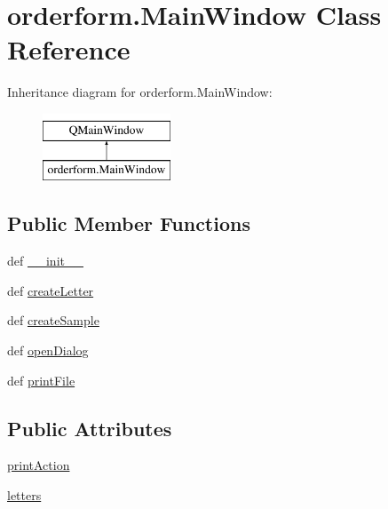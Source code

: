 \hypertarget{classorderform_1_1MainWindow}{}\section{orderform.\+Main\+Window Class Reference}
\label{classorderform_1_1MainWindow}
Inheritance diagram for orderform.\+Main\+Window\+:\begin{figure}[H]
\begin{center}
\leavevmode
\includegraphics[height=2.000000cm]{classorderform_1_1MainWindow}
\end{center}
\end{figure}
\subsection*{Public Member Functions}
\begin{DoxyCompactItemize}
\item 
def \hyperlink{classorderform_1_1MainWindow_ac3342740723f8d45876fc19d5ff3b308}{\+\_\+\+\_\+init\+\_\+\+\_\+}
\item 
def \hyperlink{classorderform_1_1MainWindow_a8d4d4af5132199cf2bc7ad9157c52a6d}{create\+Letter}
\item 
def \hyperlink{classorderform_1_1MainWindow_a3c28d2b1b84b5207e6950567006cd89f}{create\+Sample}
\item 
def \hyperlink{classorderform_1_1MainWindow_a35a023b77e0c9f2bb7e5e54b302ccfa0}{open\+Dialog}
\item 
def \hyperlink{classorderform_1_1MainWindow_a675761dbfdf670c13b75bd51debd3e3e}{print\+File}
\end{DoxyCompactItemize}
\subsection*{Public Attributes}
\begin{DoxyCompactItemize}
\item 
\hyperlink{classorderform_1_1MainWindow_a97d6890c909440fbd62b36f2f6f3f52c}{print\+Action}
\item 
\hyperlink{classorderform_1_1MainWindow_a1937632bf44dc054c43538c2f4bcac66}{letters}
\end{DoxyCompactItemize}


